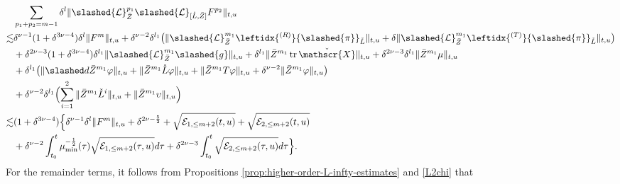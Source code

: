 \documentclass[11pt,twoside]{article}
\def\vp{\varphi}
\def\f{\frac}
\begin{document}
\begin{align}
&\sum_{p_1+p_2=m-1}\delta^l\|\slashed{\mathcal L}_{\bar Z}^{p_1}\slashed{\mathcal L}_{[\mathring L, \bar Z]}F^{p_2}\|_{t,u}\nonumber\\
\lesssim&\delta^{\nu-1}(1+\delta^{3\nu-4})\delta^l\|F^m\|_{t,u}+\delta^{\nu-2}\delta^{l_1}\bigl(\|\slashed{\mathcal{L}}_{\bar{Z}}^{m_1}\leftidx{^{(R)}}{\slashed{\pi}}_{\mathring{L}}\|_{t,u}
+\delta\|\slashed{\mathcal{L}}_{\bar{Z}}^{m_1}\leftidx{^{(T)}}{\slashed{\pi}}_{\mathring{L}}\|_{t,u} \bigr)\nonumber\\
&+\delta^{2\nu-3}(1+\delta^{3\nu-4})\delta^{l_1}\|\slashed{\mathcal{L}}_{\bar{Z}}^{m_1}\slashed{g}\|_{t,u}+\delta^{l_1}\|\bar{Z}^{m_1}\operatorname{tr}\check{\mathscr{X}}\|_{t,u} +\delta^{2\nu-3}\delta^{l_1}\|\bar Z^{m_1}\mu\|_{t,u}\nonumber\\
&+\delta^{l_1}\big(\|\slashed d\bar Z^{m_1}\vp\|_{t,u}+\|\bar Z^{m_1}\mathring L\vp\|_{t,u}+\|\bar Z^{m_1}T\vp\|_{t,u}+\delta^{\nu-2}\|\bar Z^{m_1}\vp\|_{t,u}\big)\nonumber\\
&+\delta^{\nu-2}\delta^{l_1}\Bigl(\sum_{i=1}^2\|\bar{Z}^{m_1}\check{L}^i\|_{t,u}
+\|\bar{Z}^{m_1}\upsilon\|_{t,u} \Bigr)\nonumber\\
\lesssim&(1+\delta^{3\nu-4})\Big\{\delta^{\nu-1}\delta^l\|F^m\|_{t,u}+\delta^{2\nu-\f52}+\sqrt{\mathcal E_{1,\leq m+2}(t,u)}+\sqrt{\mathcal E_{2,\leq m+2}(t,u)}\label{LF}\\
&+\delta^{\nu-2}\int_{t_0}^t\mu_{\min}^{-\f12}(\tau)\sqrt{\mathcal E_{1,\leq m+2}(\tau,u)}d\tau+\delta^{2\nu-3}\int_{t_0}^t\sqrt{\mathcal E_{2,\leq m+2}(\tau,u)}d\tau\Big\}.\nonumber
\end{align}
For the remainder terms, it follows from Propositions \ref{prop:higher-order-L-infty-estimates} and \ref{L2chi} that
\end{document}
